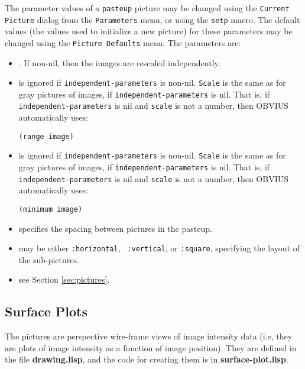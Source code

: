 The parameter values of a {\tt pasteup} picture may be changed using
the {\tt Current Picture} dialog from the {\tt Parameters} menu, or
using the {\tt setp} macro.  The default values (the values used to
initialize a new picture) for these parameters may be changed using
the {\tt Picture Defaults} menu.  The parameters are:
\begin{itemize}
\item {}.  If non-nil, then the images are
rescaled independently.

\item {} is ignored if {\tt independent-parameters} is
non-nil.  {\tt Scale} is the same as for gray pictures of images, if
{\tt independent-parameters} is nil.  That is, if {\tt
independent-parameters} is nil and {\tt scale} is not a number, then
OBVIUS automatically uses:
\begin{verbatim}
(range image)
\end{verbatim}

\item {} is ignored if {\tt independent-parameters} is
non-nil.  {\tt Scale} is the same as for gray pictures of images, if
{\tt independent-parameters} is nil.  That is, if {\tt
independent-parameters} is nil and {\tt scale} is not a number, then
OBVIUS automatically uses:
\begin{verbatim}
(minimum image)
\end{verbatim}

\item {} specifies the spacing between pictures in the
pasteup.

\item {} may be either {\tt :horizontal}, {\tt
:vertical}, or {\tt :square}, specifying the layout of the
sub-pictures.

\item {} see Section \ref{sec:pictures}.
\end{itemize}


\subsection{Surface Plots}
\label{sec:surface-plot}

The   pictures are perspective wire-frame views
of image intensity data (i.e, they are plots of image intensity as a
function of image position).  They are defined in the file {\bf
drawing.lisp}, and the code for creating them is in {\bf
surface-plot.lisp}.


